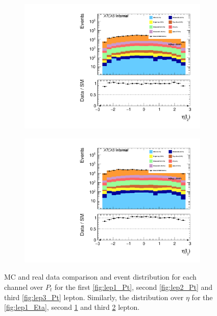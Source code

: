 \begin{figure}
{\begin{subfigure}{.425\textwidth}
        \includegraphics[width=\textwidth]{Figures/FeaturesHistograms/lep2_Eta.pdf}
        \caption{}
        \label{fig:lep2_Eta}
    \end{subfigure}
    \hfill
    \begin{subfigure}{.425\textwidth}
        \includegraphics[width=\textwidth]{Figures/FeaturesHistograms/lep3_Eta.pdf}
        \caption{}
        \label{fig:lep3_Eta}
    \end{subfigure}
    }
    \caption{\ac{MC} and real data comparison and event distribution for each channel over $P_t$ for the first \ref{fig:lep1_Pt}, 
    second \ref{fig:lep2_Pt} and third \ref{fig:lep3_Pt} lepton. Similarly, the distribution over $\eta$
    for the \ref{fig:lep1_Eta}, second \ref{fig:lep2_Eta} and third \ref{fig:lep3_Eta} lepton.}
    \label{fig:Dist1}
\end{figure}
